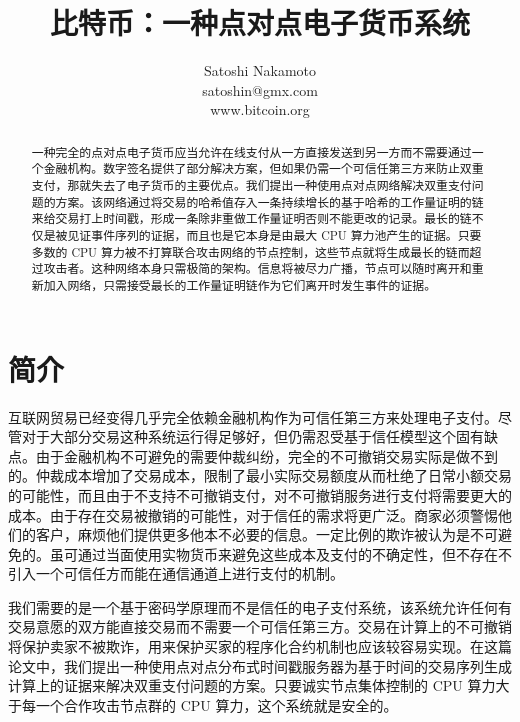 \documentclass{article}
\begin{document}
\title{比特币：一种点对点电子货币系统}
\author{
 Satoshi Nakamoto\\
 satoshin@gmx.com\\
 www.bitcoin.org\\
}
\date{}

\maketitle

\begin{abstract}
 \noindent
 一种完全的点对点电子货币应当允许在线支付从一方直接发送到另一方而不需要通过一个金融机构。数字签名提供了部分解决方案，但如果仍需一个可信任第三方来防止双重支付，那就失去了电子货币的主要优点。我们提出一种使用点对点网络解决双重支付问题的方案。该网络通过将交易的哈希值存入一条持续增长的基于哈希的工作量证明的链来给交易打上时间戳，形成一条除非重做工作量证明否则不能更改的记录。最长的链不仅是被见证事件序列的证据，而且也是它本身是由最大 CPU 算力池产生的证据。只要多数的 CPU 算力被不打算联合攻击网络的节点控制，这些节点就将生成最长的链而超过攻击者。这种网络本身只需极简的架构。信息将被尽力广播，节点可以随时离开和重新加入网络，只需接受最长的工作量证明链作为它们离开时发生事件的证据。
\end{abstract}

\section{简介}
互联网贸易已经变得几乎完全依赖金融机构作为可信任第三方来处理电子支付。尽管对于大部分交易这种系统运行得足够好，但仍需忍受基于信任模型这个固有缺点。由于金融机构不可避免的需要仲裁纠纷，完全的不可撤销交易实际是做不到的。仲裁成本增加了交易成本，限制了最小实际交易额度从而杜绝了日常小额交易的可能性，而且由于不支持不可撤销支付，对不可撤销服务进行支付将需要更大的成本。由于存在交易被撤销的可能性，对于信任的需求将更广泛。商家必须警惕他们的客户，麻烦他们提供更多他本不必要的信息。一定比例的欺诈被认为是不可避免的。虽可通过当面使用实物货币来避免这些成本及支付的不确定性，但不存在不引入一个可信任方而能在通信通道上进行支付的机制。

我们需要的是一个基于密码学原理而不是信任的电子支付系统，该系统允许任何有交易意愿的双方能直接交易而不需要一个可信任第三方。交易在计算上的不可撤销将保护卖家不被欺诈，用来保护买家的程序化合约机制也应该较容易实现。在这篇论文中，我们提出一种使用点对点分布式时间戳服务器为基于时间的交易序列生成计算上的证据来解决双重支付问题的方案。只要诚实节点集体控制的 CPU 算力大于每一个合作攻击节点群的 CPU 算力，这个系统就是安全的。
\end{document}
